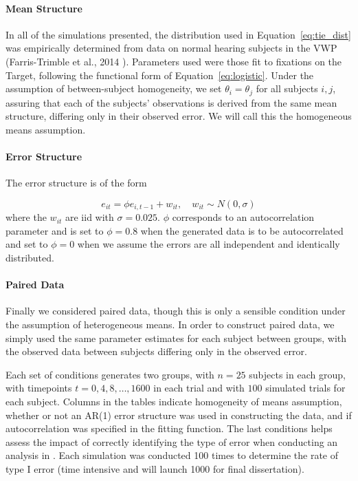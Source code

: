 \paragraph{Mean Structure} In all of the simulations presented, the distribution used in Equation~\ref{eq:tie_dist} was empirically determined from data on normal hearing subjects in the VWP (Farris-Trimble et  al., 2014 \cite{FarrisTrimble2014}). Parameters used were those fit to fixations on the Target, following the functional form of Equation~\ref{eq:logistic}. Under the assumption of between-subject homogeneity, we set $\theta_i = \theta_j$ for all subjects $i,j$, assuring that each of the subjects' observations is derived from the same mean structure, differing only in their observed error. We will call this the homogeneous means assumption.


\paragraph{Error Structure} The error structure is of the form

\begin{equation}
e_{it} = \phi e_{i, t-1} + w_{it}, \quad w_{it} \sim N(0, \sigma)
\end{equation}
where the $w_{it}$ are iid with $\sigma = 0.025$. $\phi$ corresponds to an autocorrelation parameter and is set to $\phi = 0.8$ when the generated data is to be autocorrelated and set to $\phi = 0$ when we assume the errors are all independent and identically distributed. 

\paragraph{Paired Data} Finally we considered paired data, though this is only a sensible condition under the assumption of heterogeneous means. In order to construct paired data, we simply used the same parameter estimates for each subject between groups, with the observed data between subjects differing only in the observed error.


Each set of conditions generates two groups, with $n = 25$ subjects in each group, with timepoints $t = 0, 4, 8, \dots, 1600$ in each trial and with $100$ simulated trials for each subject. Columns in the tables indicate homogeneity of means assumption, whether or not an AR(1) error structure was used in constructing the data, and if autocorrelation was specified in the fitting function. The last conditions helps assess the impact of correctly identifying the type of error when conducting an analysis in . Each simulation was conducted 100 times to determine the rate of type I error (time intensive and will launch 1000 for final dissertation). 


